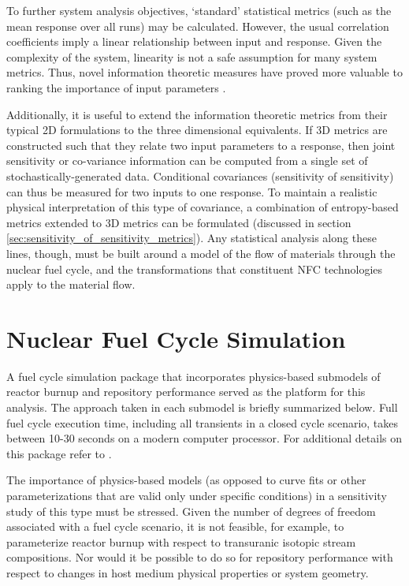 \documentclass[a4paper, 12pt]{article}
\begin{document}
To further system analysis objectives, `standard' statistical metrics (such as the mean response
over all runs) may be calculated.  However, the usual correlation coefficients imply a linear
relationship between input and response.  Given the complexity of the system, linearity is not
a safe assumption for many system metrics.  Thus, novel information theoretic measures have
proved more valuable to ranking the importance of input parameters \cite{Liu2006}.

Additionally, it is useful to extend the information theoretic metrics from their typical 2D
formulations to the three dimensional equivalents.  If 3D metrics are constructed such that
they relate two input parameters to a response, then joint sensitivity or co-variance information
can be computed from a single set of stochastically-generated data.  Conditional covariances
(sensitivity of sensitivity) can thus be measured for two inputs to one response.
To maintain a realistic physical interpretation of this type of covariance, a combination of
entropy-based metrics extended to 3D metrics can be formulated  (discussed in section
\ref{sec:sensitivity_of_sensitivity_metrics}).  Any statistical analysis along these lines, though,
must be built around a model of the flow of materials through the nuclear fuel cycle, and the
transformations that constituent NFC technologies apply to the material flow.




\section{Nuclear Fuel Cycle Simulation}
\label{sec:nfcsim}

A fuel cycle simulation package that incorporates physics-based submodels of reactor burnup \cite{Scopatz2009} and
repository performance \cite{Li2009} served as the platform for this analysis. The approach taken in each
submodel is briefly summarized below. Full fuel cycle execution time, including all transients in a closed cycle
scenario, takes between 10-30 seconds on a modern computer processor. For additional details on this package 
refer to \cite{Li2009b}.

The importance of physics-based models (as opposed to curve fits or other parameterizations that are valid
only under specific conditions) in a sensitivity study of this type must be stressed. Given the number of
degrees of freedom associated with a fuel cycle scenario, it is not feasible, for example, to parameterize
reactor burnup with respect to transuranic isotopic stream compositions. Nor would it be possible to do
so for repository performance with respect to changes in host medium physical properties or system
geometry.
\end{document}
